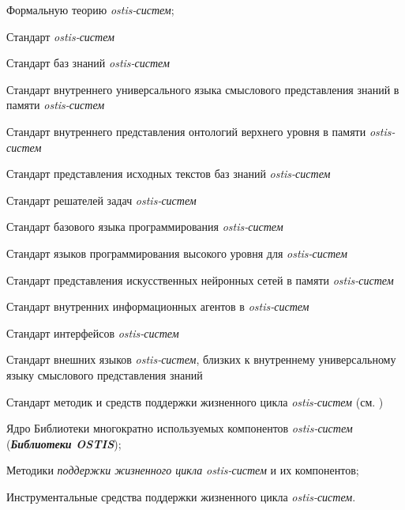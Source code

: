 \begin{textitemize}
	\item Формальную теорию \textit{ostis-систем};
	\item Стандарт \textit{ostis-систем}
	\begin{textitemize}  
		\item Стандарт баз знаний \textit{ostis-систем}
		\begin{textitemize}  
			\item Стандарт внутреннего универсального языка смыслового представления знаний в памяти \textit{ostis-систем}
			\item Стандарт внутреннего представления онтологий верхнего уровня в памяти \textit{ostis-систем}
			\item Стандарт представления исходных текстов баз знаний \textit{ostis-систем}
		\end{textitemize}  
		
		\item Стандарт решателей задач \textit{ostis-систем}
		\begin{textitemize}  
			\item Стандарт базового языка программирования \textit{ostis-систем}
			\item Стандарт языков программирования высокого уровня для \textit{ostis-систем}
			\item Стандарт представления искусственных нейронных сетей в памяти \textit{ostis-систем}
			\item Стандарт внутренних информационных агентов в \textit{ostis-систем}
		\end{textitemize}  
		
		\item Стандарт интерфейсов \textit{ostis-систем}
		\begin{textitemize}  
			\item Стандарт внешних языков \textit{ostis-систем}, близких к внутреннему универсальному языку смыслового представления знаний
		\end{textitemize}  
	\end{textitemize}
	\item Стандарт методик и средств поддержки жизненного цикла \textit{ostis-систем} (см. \cite{Standart2021})
	\begin{textitemize}
		\item Ядро Библиотеки многократно используемых компонентов \textit{ostis-систем} (\textbf{\textit{Библиотеки OSTIS}});
		\item Методики \textit{поддержки жизненного цикла} \textit{ostis-систем} и их компонентов;
		\item Инструментальные средства поддержки жизненного цикла \textit{ostis-систем}.
	\end{textitemize}
\end{textitemize}

